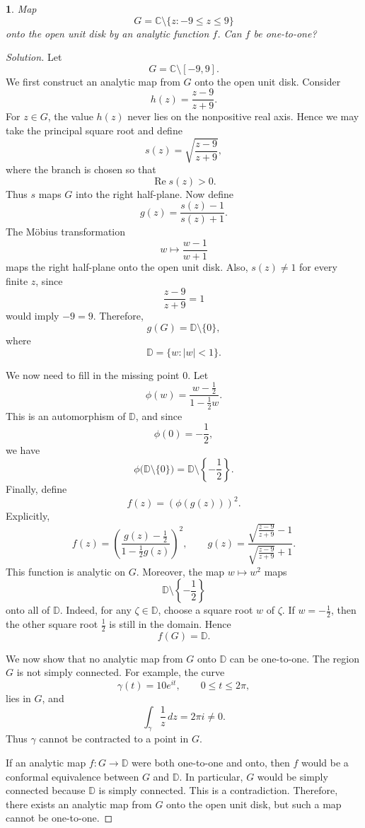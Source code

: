 \documentclass[12pt, a4paper]{report}
\theoremstyle{spaced}
\newtheorem{exercise}{}
\begin{document}
\begin{exercise}
	Map
	\[
		G=\mathbb{C}\setminus\{z:-9\leq z\leq 9\}
	\]
	onto the open unit disk by an analytic function $f$. Can $f$ be one-to-one?
\end{exercise}

\begin{proof}[Solution]
	Let
	\[
		G=\mathbb{C}\setminus[-9,9].
	\]
	We first construct an analytic map from $G$ onto the open unit disk.
	Consider
	\[
		h(z)=\frac{z-9}{z+9}.
	\]
	For $z\in G$, the value $h(z)$ never lies on the nonpositive real axis. Hence
	we may take the principal square root and define
	\[
		s(z)=\sqrt{\frac{z-9}{z+9}},
	\]
	where the branch is chosen so that
	\[
		\operatorname{Re}s(z)>0.
	\]
	Thus $s$ maps $G$ into the right half-plane.
	Now define
	\[
		g(z)=\frac{s(z)-1}{s(z)+1}.
	\]
	The M\"obius transformation
	\[
		w\mapsto \frac{w-1}{w+1}
	\]
	maps the right half-plane onto the open unit disk. Also, $s(z)\neq 1$ for
	every finite $z$, since
	\[
		\frac{z-9}{z+9}=1
	\]
	would imply $-9=9$. Therefore,
	\[
		g(G)=\mathbb{D}\setminus\{0\},
	\]
	where
	\[
		\mathbb{D}=\{w:|w|<1\}.
	\]

	We now need to fill in the missing point $0$. Let
	\[
		\phi(w)=\frac{w-\frac12}{1-\frac12w}.
	\]
	This is an automorphism of $\mathbb{D}$, and since
	\[
		\phi(0)=-\frac12,
	\]
	we have
	\[
		\phi\bigl(\mathbb{D}\setminus\{0\}\bigr)
		=
		\mathbb{D}\setminus\left\{-\frac12\right\}.
	\]
	Finally, define
	\[
		f(z)=\left(\phi(g(z))\right)^2.
	\]
	Explicitly,
	\[
		f(z)=
		\left(
		\frac{g(z)-\frac12}{1-\frac12g(z)}
		\right)^2,
		\qquad
		g(z)=
		\frac{
			\sqrt{\frac{z-9}{z+9}}-1
		}{
			\sqrt{\frac{z-9}{z+9}}+1
		}.
	\]
	This function is analytic on $G$.
	Moreover, the map $w\mapsto w^2$ maps
	\[
		\mathbb{D}\setminus\left\{-\frac12\right\}
	\]
	onto all of $\mathbb{D}$. Indeed, for any $\zeta\in\mathbb{D}$, choose a
	square root $w$ of $\zeta$. If $w=-\frac12$, then the other square root
	$\frac12$ is still in the domain. Hence
	\[
		f(G)=\mathbb{D}.
	\]

	We now show that no analytic map from $G$ onto $\mathbb{D}$ can be
	one-to-one. The region $G$ is not simply connected. For example, the curve
	\[
		\gamma(t)=10e^{it},
		\qquad 0\leq t\leq 2\pi,
	\]
	lies in $G$, and
	\[
		\int_\gamma \frac{1}{z}\,dz=2\pi i\neq 0.
	\]
	Thus $\gamma$ cannot be contracted to a point in $G$.

	If an analytic map $f:G\to\mathbb{D}$ were both one-to-one and onto, then
	$f$ would be a conformal equivalence between $G$ and $\mathbb{D}$. In
	particular, $G$ would be simply connected because $\mathbb{D}$ is simply
	connected. This is a contradiction.
	Therefore, there exists an analytic map from $G$ onto the open unit disk,
	but such a map cannot be one-to-one.
\end{proof}
\end{document}

